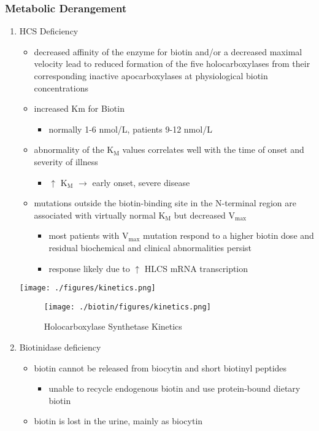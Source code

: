 \documentclass{scrartcl}
\begin{document}
\subsubsection{Metabolic Derangement}
\label{sec:org8be6105}
\begin{enumerate}
\item HCS Deficiency
\label{sec:org027d47b}
\begin{itemize}
\item decreased affinity of the enzyme for biotin and/or a decreased
maximal velocity lead to reduced formation of the five
holocarboxylases from their corresponding inactive apocarboxylases
at physiological biotin concentrations
\item increased Km for Biotin
\begin{itemize}
\item normally 1-6 nmol/L, patients 9-12 nmol/L
\end{itemize}
\item abnormality of the K\(_{\text{M}}\) values correlates well with the time of onset
and severity of illness
\begin{itemize}
\item \(\uparrow\) K\(_{\text{M}}\) \(\to\) early onset, severe disease
\end{itemize}

\item mutations outside the biotin-binding site in the N-terminal region
are associated with virtually normal K\(_{\text{M}}\) but decreased V\(_{\text{max}}\)
\begin{itemize}
\item most patients with V\(_{\text{max}}\) mutation respond to a higher biotin
dose and residual biochemical and clinical abnormalities persist
\item response likely due to \(\uparrow\) HLCS mRNA transcription
\end{itemize}
\end{itemize}

\begin{center}
\texttt{[image: ./figures/kinetics.png]}
\end{center}

\begin{figure}[htbp]
\centering
\texttt{[image: ./biotin/figures/kinetics.png]}
\caption[Kinetics]{\label{fig:orgc9f3392}
Holocarboxylase Synthetase Kinetics}
\end{figure}

\item Biotinidase deficiency
\label{sec:org3158406}
\begin{itemize}
\item biotin cannot be released from biocytin and short biotinyl
peptides
\begin{itemize}
\item unable to recycle endogenous biotin and use protein-bound dietary biotin
\end{itemize}
\item biotin is lost in the urine, mainly as biocytin
\end{itemize}
\end{enumerate}
\end{document}
